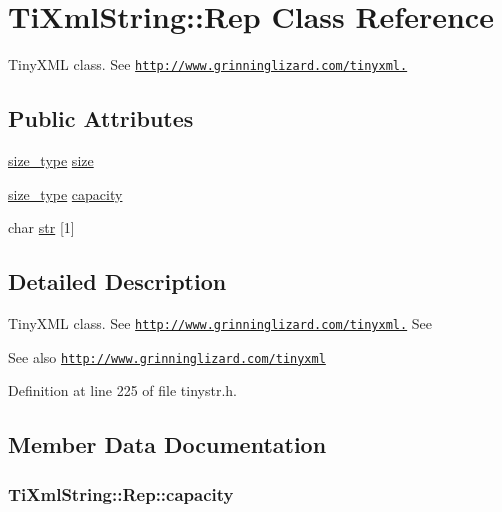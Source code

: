 \hypertarget{struct_ti_xml_string_1_1_rep}{
\section{TiXmlString::Rep Class Reference}
\label{struct_ti_xml_string_1_1_rep}
}


TinyXML class. See \href{http://www.grinninglizard.com/tinyxml.}{\tt http://www.grinninglizard.com/tinyxml.}  
\subsection*{Public Attributes}
\begin{DoxyCompactItemize}
\item 
\hyperlink{class_ti_xml_string_abeb2c1893a04c17904f7c06546d0b971}{size\_\-type} \hyperlink{struct_ti_xml_string_1_1_rep_a3470330fe806a575dbb5909a1b908ac1}{size}
\item 
\hyperlink{class_ti_xml_string_abeb2c1893a04c17904f7c06546d0b971}{size\_\-type} \hyperlink{struct_ti_xml_string_1_1_rep_a9f38da318212f4a2f6ebe0afdbfaf477}{capacity}
\item 
char \hyperlink{struct_ti_xml_string_1_1_rep_a88a7037a489827ec9e59b008e11342b0}{str} \mbox{[}1\mbox{]}
\end{DoxyCompactItemize}


\subsection{Detailed Description}
TinyXML class. See \href{http://www.grinninglizard.com/tinyxml.}{\tt http://www.grinninglizard.com/tinyxml.} See \begin{DoxySeeAlso}{See also}
\href{http://www.grinninglizard.com/tinyxml}{\tt http://www.grinninglizard.com/tinyxml} 
\end{DoxySeeAlso}


Definition at line 225 of file tinystr.h.

\subsection{Member Data Documentation}
\hypertarget{struct_ti_xml_string_1_1_rep_a9f38da318212f4a2f6ebe0afdbfaf477}{
\subsubsection[{capacity}]{ {\bf TiXmlString::Rep::capacity}}}
\label{struct_ti_xml_string_1_1_rep_a9f38da318212f4a2f6ebe0afdbfaf477}


